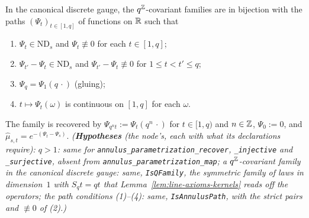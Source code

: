 \begin{theorem}
\label{thm:annulus-parametrization}
\leanok
{}
In the canonical discrete gauge, the $q^{\mathbb{Z}}$-covariant families are in bijection with the paths
$(\Psi_t)_{t \in [1,q]}$ of functions on $\mathbb{R}$ such that
\begin{enumerate}
\item $\Psi_t \in \mathrm{ND}_s$ and $\Psi_t \not\equiv 0$ for each $t \in [1,q]$;
\item $\Psi_{t'} - \Psi_t \in \mathrm{ND}_s$ and $\Psi_{t'} - \Psi_t \not\equiv 0$ for
$1 \le t < t' \le q$;
\item $\Psi_q = \Psi_1(q\,\cdot)$ (gluing);
\item $t \mapsto \Psi_t(\omega)$ is continuous on $[1,q]$ for each $\omega$.
\end{enumerate}
The family is recovered by $\Psi_{q^nt} := \Psi_t(q^n\,\cdot)$ for $t \in [1,q)$ and $n \in \mathbb{Z}$,
$\Psi_0 := 0$, and $\widehat\mu_{s,t} = e^{-(\Psi_t - \Psi_s)}$.
\statusT\quad\emph{(\textbf{Hypotheses} (the node's, each with what its declarations require): $q > 1$:
same for \texttt{annulus\_parametrization\_recover}, \texttt{\_injective} and \texttt{\_surjective},
absent from \texttt{annulus\_parametrization\_map}; a $q^{\mathbb{Z}}$-covariant family in the canonical
discrete gauge: same, \texttt{IsQFamily}, the symmetric family of laws in dimension~$1$ with
$S_qt = qt$ that Lemma~\ref{lem:line-axioms-kernels} reads off the operators; the path conditions
(1)--(4): same, \texttt{IsAnnulusPath}, with the strict pairs and $\not\equiv 0$ of (2).)}
\end{theorem}

